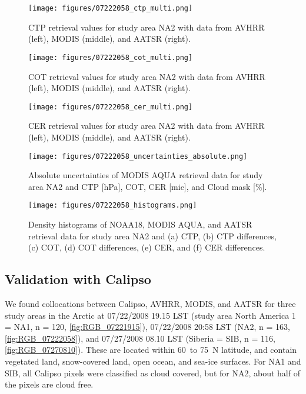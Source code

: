 \begin{figure*}[h]
  \texttt{[image: figures/07222058\_ctp\_multi.png]}
  \caption{CTP retrieval values for study area NA2 with data from AVHRR (left), MODIS (middle), and AATSR (right).}
  \label{fig:CTP_intercomparison}

  \texttt{[image: figures/07222058\_cot\_multi.png]}
  \caption{COT retrieval values for study area NA2 with data from AVHRR (left), MODIS (middle), and AATSR (right).}
  \label{fig:COT_intercomparison}

  \texttt{[image: figures/07222058\_cer\_multi.png]}
  \caption{CER retrieval values for study area NA2 with data from AVHRR (left), MODIS (middle), and AATSR (right).}
  \label{fig:CER_intercomparison}
\end{figure*}

\begin{figure*}[h]
  \texttt{[image: figures/07222058\_uncertainties\_absolute.png]} %
  \caption{Absolute uncertainties of MODIS AQUA retrieval data for study area NA2 and CTP [hPa], COT, CER [mic], and Cloud mask [\%].} %
  \label{fig:uncertainties}
\end{figure*}

\begin{figure*}[h]
  \texttt{[image: figures/07222058\_histograms.png]}
  \caption{Density histograms of NOAA18, MODIS AQUA, and AATSR retrieval data for study area NA2 and (a) CTP, (b) CTP differences, (c) COT, (d) COT differences, (e) CER, and (f) CER differences.}
  \label{fig:histograms}
\end{figure*}

\subsection{Validation with Calipso}

We found collocations between Calipso, AVHRR, MODIS, and AATSR for three study areas in the Arctic at 07/22/2008 19.15 LST (study area North America 1 = NA1, n = 120, \cref{fig:RGB_07221915}), 07/22/2008 20:58 LST (NA2, n = 163, \cref{fig:RGB_07222058}), and 07/27/2008 08.10 LST (Siberia = SIB, n = 116, \cref{fig:RGB_07270810}). These are located within 60\textdegree\ to 75\textdegree\ N latitude, and contain vegetated land, snow-covered land, open ocean, and sea-ice surfaces. For NA1 and SIB, all Calipso pixels were classified as cloud covered, but for NA2, about half of the pixels are cloud free.

